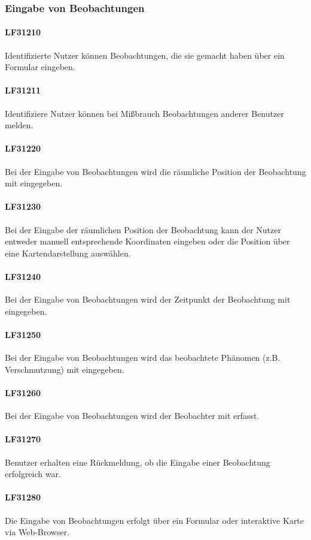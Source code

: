 \documentclass[a4paper,11pt]{scrartcl}
\begin{document}
		\subsubsection{Eingabe von Beobachtungen}
			\paragraph{LF31210}
				Identifizierte Nutzer können Beobachtungen, die sie gemacht haben über ein Formular eingeben.
			\paragraph{LF31211}
				Identifiziere Nutzer können bei Mißbrauch Beobachtungen anderer Benutzer melden.
			\paragraph{LF31220}
				Bei der Eingabe von Beobachtungen wird die räumliche Position der Beobachtung mit eingegeben.		
			\paragraph{LF31230}
				Bei der Eingabe der räumlichen Position der Beobachtung kann der Nutzer entweder manuell entsprechende Koordinaten eingeben oder die Position über eine Kartendarstellung auswählen.		
			\paragraph{LF31240}
				Bei der Eingabe von Beobachtungen wird der Zeitpunkt der Beobachtung mit eingegeben.			
			\paragraph{LF31250}
				Bei der Eingabe von Beobachtungen wird das beobachtete Phänomen (z.B. Verschmutzung) mit eingegeben.
			\paragraph{LF31260}
				Bei der Eingabe von Beobachtungen wird der Beobachter mit erfasst.
			\paragraph{LF31270}
				Benutzer erhalten eine Rückmeldung, ob die Eingabe einer Beobachtung erfolgreich war.
			\paragraph{LF31280}
				Die Eingabe von Beobachtungen erfolgt über ein Formular oder interaktive Karte via Web-Browser.
\end{document}
